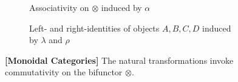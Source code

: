 \documentclass[10pt,a4paper,reqno]{amsart}
\numberwithin{equation}{section}
\numberwithin{figure}{section}
\begin{document}
\begin{figure}[ht]
        \begin{subfigure}{\textwidth}
                \centering
                \caption{Associativity on $\otimes$ induced by $\alpha$}
        \end{subfigure}

        \begin{subfigure}{\textwidth}
                \centering
                \caption{Left- and right-identities of objects $A,B,C,D$ induced
                        by $\lambda$ and $\rho$}
        \end{subfigure}%
        \caption{\textbf{[Monoidal Categories]} The natural transformations
                invoke commutativity on the bifunctor $\otimes$.}
        \vspace{1.5em}
        \label{fig:monoidal-cat-commute}
\end{figure}
\end{document}

